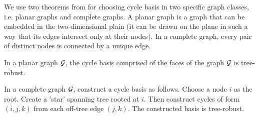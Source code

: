 We use two theorems from \cite{gelfand2012generalized} for choosing cycle basis in two specific graph classes, i.e. planar graphs and complete graphs. A planar graph is a graph that can be embedded in the two-dimensional plain (it can be drawn on the plane in such a way that its edges intersect only at their nodes). In a complete graph, every pair of distinct nodes is connected by a unique edge.

\begin{theorem}\label{thm:planar-tree-robust}
  In a planar graph $\mathcal{G}$, the cycle basis comprised of the faces of the graph $\mathcal{G}$ is tree-robust.
\end{theorem}

\begin{theorem}\label{thm:complete-tree-robust}
  In a complete graph $\mathcal{G}$, construct a cycle basis as follows. Choose a node $i$ as the root. Create a 'star' spanning tree rooted at $i$. Then construct cycles of form $(i,j,k)$ from each off-tree edge $(j,k)$. The constructed basis is tree-robust.
\end{theorem}

